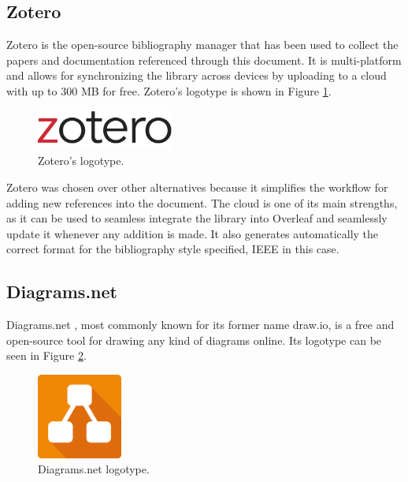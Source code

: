 \subsection{Zotero}

Zotero \cite{noauthor_zotero_nodate} is the open-source bibliography manager that has been used to collect the papers and documentation referenced through this document. It is multi-platform and allows for synchronizing the library across devices by uploading to a cloud with up to 300 MB for free. Zotero's logotype is shown in Figure \ref{fig:zotero}.

\begin{figure}[h]
  \centering
  \includegraphics[width=0.4\textwidth]{Figures/zotero.png}
  \caption{
    Zotero's logotype.
  }
  \label{fig:zotero}
\end{figure}

Zotero was chosen over other alternatives because it simplifies the workflow for adding new references into the document. The cloud is one of its main strengths, as it can be used to seamless integrate the library into Overleaf and seamlessly update it whenever any addition is made. It also generates automatically the correct format for the bibliography style specified, IEEE in this case.

\subsection{Diagrams.net}

Diagrams.net \cite{noauthor_diagram_nodate}, most commonly known for its former name draw.io, is a free and open-source tool for drawing any kind of diagrams online. Its logotype can be seen in Figure \ref{fig:drawio}.

\begin{figure}[h]
  \centering
  \includegraphics[width=0.25\textwidth]{Figures/drawio.png}
  \caption{
    Diagrams.net logotype.
  }
  \label{fig:drawio}
\end{figure}

